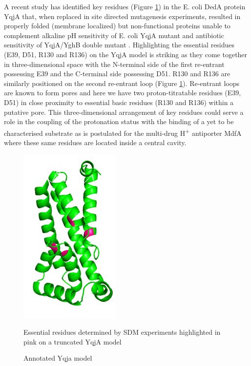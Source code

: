 A recent study has identified key residues (Figure \ref{fig:Yqja}) in the E. coli DedA protein YqjA that, when replaced in site directed mutagenesis experiments, resulted in properly folded (membrane localized) but non-functional proteins unable to complement alkaline pH sensitivity of E. coli YqjA mutant and antibiotic sensitivity of YqjA/YghB double mutant \cite{Panta2019}. Highlighting the essential residues (E39, D51, R130 and R136) on the YqjA model is striking as they come together in three-dimensional space with the N-terminal side of the first re-entrant possessing E39 and the C-terminal side possessing D51. R130 and R136 are similarly positioned on the second re-entrant loop (Figure \ref{fig:Yqja}). Re-entrant loops are known to form pores and here we have two proton-titratable residues (E39, D51) in close proximity to essential basic residues (R130 and R136) within a putative pore. This three-dimensional arrangement of key residues could serve a role in the coupling of the protonation status with the binding of a yet to be characterised substrate as is postulated for the multi-drug H\textsuperscript{+} antiporter MdfA \cite{Heng2015} where these same residues are located inside a central cavity.  

\begin{figure}[th!]
    \centering
    \includegraphics[width=50mm, scale =0.5]{Results/fig8.jpg}
    \caption{Annotated Yqja model}
    \label{fig:Yqja}
    \small
    Essential residues determined by SDM experiments highlighted in pink on a truncated YqjA model
\end{figure}

